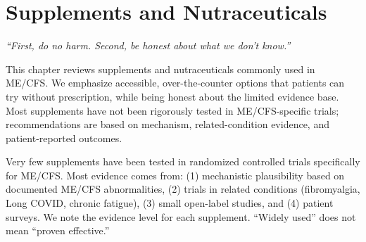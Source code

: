 \chapter{Supplements and Nutraceuticals}
\label{ch:supplements}

\begin{flushright}
\textit{``First, do no harm. Second, be honest about what we don't know.''}
\end{flushright}

\vspace{1em}

This chapter reviews supplements and nutraceuticals commonly used in ME/CFS. We emphasize accessible, over-the-counter options that patients can try without prescription, while being honest about the limited evidence base. Most supplements have not been rigorously tested in ME/CFS-specific trials; recommendations are based on mechanism, related-condition evidence, and patient-reported outcomes.

\begin{observation}
Very few supplements have been tested in randomized controlled trials specifically for ME/CFS. Most evidence comes from: (1) mechanistic plausibility based on documented ME/CFS abnormalities, (2) trials in related conditions (fibromyalgia, Long COVID, chronic fatigue), (3) small open-label studies, and (4) patient surveys. We note the evidence level for each supplement. ``Widely used'' does not mean ``proven effective.''
\end{observation}


